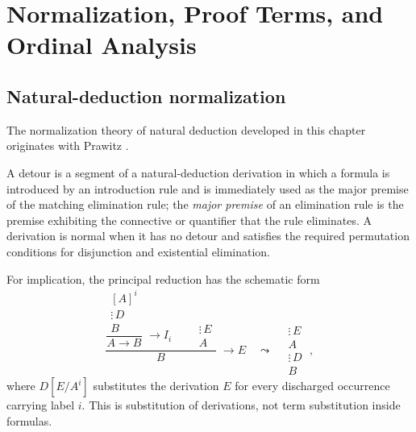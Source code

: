 \chapter[Normalization and Ordinal Analysis]{Normalization, Proof Terms, and Ordinal Analysis}
\label{ch:normalization-curry-howard}

\section{Natural-deduction normalization}
\label{sec:normalization-curry-howard-01}

The normalization theory of natural deduction developed in this chapter
originates with Prawitz \cite{Prawitz1965}.

\begin{definition}[Detour]
A detour is a segment of a natural-deduction derivation in which a formula is
introduced by an introduction rule and is immediately used as the major
premise of the matching elimination rule; the \emph{major premise} of an
elimination rule is the premise exhibiting the connective or quantifier
that the rule eliminates.  A derivation is normal when it has
no detour and satisfies the required permutation conditions for disjunction
and existential elimination.
\end{definition}

For implication, the principal reduction has the schematic form
\[
  \dfrac{
    \dfrac{\begin{matrix}{[A]}^i\\ \vdots\,D\\ B\end{matrix}}
          {A\to B}\;\to I_i
    \qquad
    \begin{matrix}\vdots\,E\\ A\end{matrix}
  }{B}\;\to E
  \quad\leadsto\quad
  \begin{matrix}\vdots\,E\\ A\\ \vdots\,D\\ B\end{matrix}\;,
\]
where \(D[E/A^i]\) substitutes the derivation \(E\) for every discharged
occurrence carrying label \(i\).  This is substitution of derivations, not term
substitution inside formulas.

